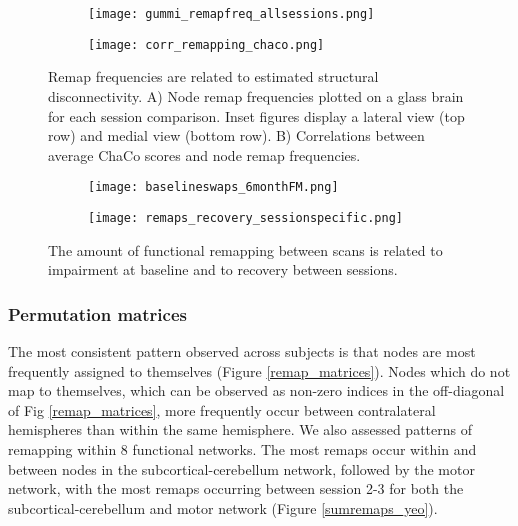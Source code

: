 \documentclass[10pt]{article}
\begin{document}
\begin{figure}[ht] %
		\begin{subfigure}{.5\textwidth}
			\centering
			\texttt{[image: gummi\_remapfreq\_allsessions.png]}  
			\caption{ }
			\label{gummi_remaps}
		\end{subfigure}
		\begin{subfigure}{.5\textwidth}
			\centering
			\texttt{[image: corr\_remapping\_chaco.png]}  
			\caption{ }
			\label{corr_remapping_chaco}
		\end{subfigure}
	\caption{Remap frequencies are related to estimated structural disconnectivity.  A) Node remap frequencies plotted on a glass brain for each session comparison.  Inset figures display a lateral view (top row) and medial view (bottom row).  B) Correlations between average ChaCo scores and node remap frequencies.}
\end{figure}

\begin{figure} %
		\begin{subfigure}{.5\textwidth}
			\centering
			\texttt{[image: baselineswaps\_6monthFM.png]}  
			\caption{ }
			\label{remaps_6monthrecovery}
		\end{subfigure}
		\begin{subfigure}{.5\textwidth}
			\centering
			\texttt{[image: remaps\_recovery\_sessionspecific.png]}  
			\caption{ }
			\label{remaps_recovery_allsessions}
		\end{subfigure}
	\caption{The amount of functional remapping between scans is related to impairment at baseline and to recovery between sessions.}
\end{figure}

	\subsubsection*{Permutation matrices}
	The most consistent pattern observed across subjects is that nodes are most frequently assigned to themselves (Figure \ref{remap_matrices}).  Nodes which do not map to themselves, which can be observed as non-zero indices in the off-diagonal of Fig \ref{remap_matrices},  more frequently occur between contralateral hemispheres than within the same hemisphere. We also assessed patterns of remapping within 8 functional networks. The most remaps occur within and between nodes in the subcortical-cerebellum network, followed by the motor network, with the most remaps occurring between session 2-3 for both the subcortical-cerebellum and motor network (Figure \ref{sumremaps_yeo}). 
\end{document}
